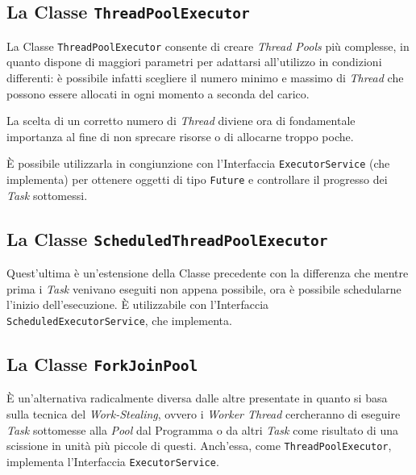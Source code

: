 \subsection{La Classe \texttt{ThreadPoolExecutor}}
La Classe \texttt{ThreadPoolExecutor}\cite{ThreadPoolExecutor_JavaDocs} consente di creare \textit{Thread Pools} più complesse, in quanto dispone di maggiori parametri per adattarsi all'utilizzo in condizioni differenti: è possibile infatti scegliere il numero minimo e massimo di \textit{Thread} che possono essere allocati in ogni momento a seconda del carico. \par
La scelta di un corretto numero di \textit{Thread} diviene ora di fondamentale importanza al fine di non sprecare risorse o di allocarne troppo poche. \par
È possibile utilizzarla in congiunzione con l'Interfaccia \texttt{ExecutorService}\cite{ExecutorService_JavaDocs} (che implementa) per ottenere oggetti di tipo \texttt{Future}\cite{Future_JavaDocs} e controllare il progresso dei \textit{Task} sottomessi.
\subsection{La Classe \texttt{ScheduledThreadPoolExecutor}}
Quest'ultima è un'estensione della Classe precedente con la differenza che mentre prima i \textit{Task} venivano eseguiti non appena possibile, ora è possibile schedularne l'inizio dell'esecuzione\cite{ScheduledThreadPoolExecutor_JavaDocs}. È utilizzabile con l'Interfaccia \texttt{ScheduledExecutorService}\cite{ScheduledExecutorService_JavaDocs}, che implementa.
\subsection{La Classe \texttt{ForkJoinPool}}
È un'alternativa radicalmente diversa dalle altre presentate in quanto si basa sulla tecnica del \textit{Work-Stealing}\cite{ForkJoinPool_JavaDocs}, ovvero i \textit{Worker Thread} cercheranno di eseguire \textit{Task} sottomesse alla \textit{Pool} dal Programma o da altri \textit{Task} come risultato di una scissione in unità più piccole di questi. Anch'essa, come \texttt{ThreadPoolExecutor}, implementa l'Interfaccia \texttt{ExecutorService}.
